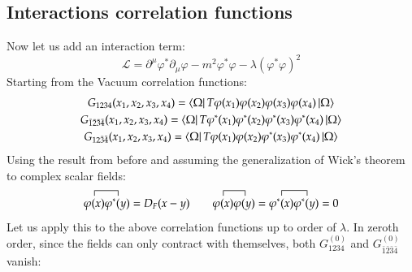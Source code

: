 \documentclass{article}
\begin{document}
\subsection{Interactions correlation functions}
Now let us add an interaction term:
\begin{equation}
    \mathcal{L} = \partial^\mu\varphi^*\partial_\mu\varphi - m^2\varphi^*\varphi - \lambda(\varphi^*\varphi)^2
\end{equation}
Starting from the Vacuum correlation functions:
\begin{equation}
\begin{gathered}
    G_{1234}(x_1, x_2, x_3, x_4) = \bra{\Omega}T \varphi(x_1) \varphi(x_2) \varphi(x_3) \varphi(x_4) \ket{\Omega}
    \\
    G_{\bar{1}\bar{2}\bar{3}\bar{4}}(x_1, x_2, x_3, x_4) = \bra{\Omega}T \varphi^*(x_1) \varphi^*(x_2) \varphi^*(x_3) \varphi^*(x_4) \ket{\Omega}
    \\
    G_{12\bar{3}\bar{4}}(x_1, x_2, x_3, x_4) = \bra{\Omega}T \varphi(x_1) \varphi(x_2) \varphi^*(x_3) \varphi^*(x_4) \ket{\Omega}
\end{gathered}
\end{equation}
Using the result from before and assuming the generalization of Wick's theorem to complex scalar fields:
\begin{equation}
    \contraction{}{\varphi(x)}{}{\varphi^*(y)}\varphi(x)\varphi^*(y) = D_F(x - y)
    \qquad
    \contraction{}{\varphi(x)}{}{\varphi(y)}\varphi(x)\varphi(y) =
    \contraction{}{\varphi^*(x)}{}{\varphi^*(y)}\varphi^*(x)\varphi^*(y) = 0
\end{equation}
Let us apply this to the above correlation functions up to order of $\lambda$. In zeroth order, since the fields can only contract with themselves, both $G_{1234}^{(0)}$ and $G_{\bar{1}\bar{2}\bar{3}\bar{4}}^{(0)}$ vanish:
\end{document}
